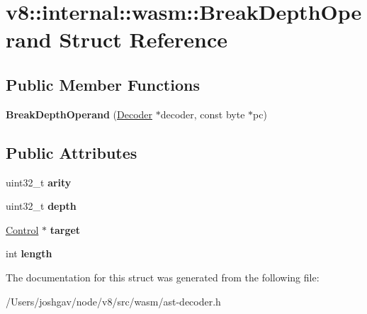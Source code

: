 \hypertarget{structv8_1_1internal_1_1wasm_1_1_break_depth_operand}{}\section{v8\+:\+:internal\+:\+:wasm\+:\+:Break\+Depth\+Operand Struct Reference}
\label{structv8_1_1internal_1_1wasm_1_1_break_depth_operand}
\subsection*{Public Member Functions}
\begin{DoxyCompactItemize}
\item 
{\bfseries Break\+Depth\+Operand} (\hyperlink{classv8_1_1internal_1_1wasm_1_1_decoder}{Decoder} $\ast$decoder, const byte $\ast$pc)\hypertarget{structv8_1_1internal_1_1wasm_1_1_break_depth_operand_a251a2dff9f3fd9dff9c162b46ccd29d5}{}\label{structv8_1_1internal_1_1wasm_1_1_break_depth_operand_a251a2dff9f3fd9dff9c162b46ccd29d5}

\end{DoxyCompactItemize}
\subsection*{Public Attributes}
\begin{DoxyCompactItemize}
\item 
uint32\+\_\+t {\bfseries arity}\hypertarget{structv8_1_1internal_1_1wasm_1_1_break_depth_operand_abe94783be209057d1b0e991a226fbe5b}{}\label{structv8_1_1internal_1_1wasm_1_1_break_depth_operand_abe94783be209057d1b0e991a226fbe5b}

\item 
uint32\+\_\+t {\bfseries depth}\hypertarget{structv8_1_1internal_1_1wasm_1_1_break_depth_operand_a24557dd47c1601bd3a6000facffcf1e5}{}\label{structv8_1_1internal_1_1wasm_1_1_break_depth_operand_a24557dd47c1601bd3a6000facffcf1e5}

\item 
\hyperlink{structv8_1_1internal_1_1wasm_1_1_control}{Control} $\ast$ {\bfseries target}\hypertarget{structv8_1_1internal_1_1wasm_1_1_break_depth_operand_a44fcb39aa0c641ab811a65c0c14e1f70}{}\label{structv8_1_1internal_1_1wasm_1_1_break_depth_operand_a44fcb39aa0c641ab811a65c0c14e1f70}

\item 
int {\bfseries length}\hypertarget{structv8_1_1internal_1_1wasm_1_1_break_depth_operand_a625b6ec35aa6f54de32300c835070a31}{}\label{structv8_1_1internal_1_1wasm_1_1_break_depth_operand_a625b6ec35aa6f54de32300c835070a31}

\end{DoxyCompactItemize}


The documentation for this struct was generated from the following file\+:\begin{DoxyCompactItemize}
\item 
/\+Users/joshgav/node/v8/src/wasm/ast-\/decoder.\+h\end{DoxyCompactItemize}
